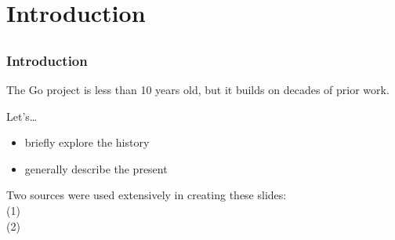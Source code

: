\usetitlepagetemplate{
  \vbox{}
  \vfill
  \begin{centering}
    {\textcolor{macewan}{\Large{\inserttitle}}}\par
    \ifx\insertsubtitle\@empty\else\vskip0.0em\vskip0.4em{\large{\structure{\textcolor{macewan}\insertsubtitle}}}\par\fi
    \vskip2em\par
    \insertauthor\par
    \insertinstitute\par\vskip1.25em
    \inserteventshort\par\vskip1.25em
    \insertdate\par
  \end{centering}
  \vfill
}



\frame[plain,c]{
  \titlepage
}


\section{Introduction}
\subsection*{}

\begin{frame}[t]
  \frametitle{Introduction}

  The Go project is less than 10 years old, but it builds on decades of prior work.

  \vspace{\baselineskip}
  Let's\dots
  \begin{itemize}
  \item briefly explore the history
  \item generally describe the present
  \end{itemize}

  \fullvfill
  \hfill
  \begin{minipage}{0.85\linewidth}
    \raggedright
    \footnotesize
    Two sources were used extensively in creating these slides:\\
    (1)~\\
    (2)~
  \end{minipage}
\end{frame}

